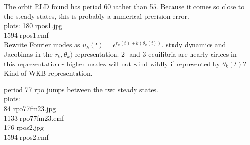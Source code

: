 The orbit RLD found has period 60 
rather than 55.  Because it comes so close to the steady states, 
this is probably a numerical precision error.
\\
plots:
 180 rpos1.jpg	\\
1594 rpos1.emf	\\


Rewrite Fourier modes as $u_k(t) = e^{r_k(t) + k(\theta_k(t))}$, study
dynamics and Jacobinas in the $\dot{r_k},\dot{\theta_k})$ representation.
$2$- and $3$-equilibria are nearly cirlces in this representation - higher
modes will not wind wildly if represented by $\theta_k(t)$? Kind of WKB
representation.

period 77 rpo jumps between the two steady states.
\\
plots:	\\
  84 rpo77fm23.jpg	\\
1133 rpo77fm23.emf	\\
 176 rpos2.jpg	\\
1594 rpos2.emf	\\

